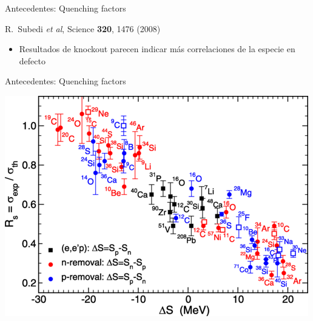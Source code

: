 \documentclass{beamer}
\begin{document}
\begin{frame}{Antecedentes: Quenching factors}
\begin{minipage}{0.45\textwidth}
\begin{center}
    \tiny R.~Subedi \textit{et al}, Science \textbf{320}, 1476 (2008)
    \end{center}
    \end{minipage}
    \vspace{1cm}
    \begin{itemize}
    \item Resultados de knockout parecen indicar más correlaciones de la especie en defecto
    \end{itemize}
    
\end{frame}

\begin{frame}{Antecedentes: Quenching factors} 
    \begin{minipage}{0.45\textwidth}
    \begin{center}
    \includegraphics[height=0.4\textheight]{Tostevin.png}
    

\end{center}
\end{minipage}
\end{frame}
\end{document}
